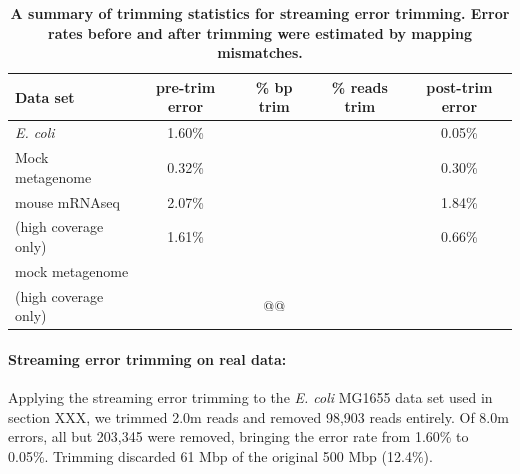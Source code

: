 \documentclass{article}
\begin{document}
\begin{table}
\begin{tabular}{|l|c|c|c|c|}
\hline
Data set        & pre-trim error & \% bp trim & \% reads trim & post-trim error \\
\hline
{\em E. coli}   & 1.60\%         &                  &             & 0.05\% \\
Mock metagenome & 0.32\%         &                  &             & 0.30\% \\
mouse mRNAseq   & 2.07\%         &                  &             & 1.84\% \\
(high coverage only) & 1.61\%    &                  &             & 0.66\% \\
mock metagenome &                &                  &             &        \\
(high coverage only) &           &    @@              &             &        \\
\hline
\end{tabular}

\caption{{\bf A summary of trimming statistics for streaming error trimming.
Error rates before and after trimming were estimated by mapping mismatches.}}
\label{tab:trimming}
\end{table}

\paragraph{Streaming error trimming on real data:}



%

Applying the streaming error trimming to the {\em E. coli} MG1655 data
set used in section XXX, we trimmed 2.0m reads and removed 98,903
reads entirely.  Of 8.0m errors, all but 203,345 were removed,
bringing the error rate from 1.60\% to 0.05\%.  Trimming discarded 61
Mbp of the original 500 Mbp (12.4\%).
\end{document}

